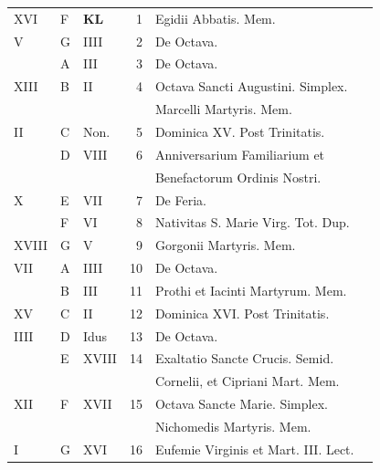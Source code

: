 \color{Red}\color{black}

\begin{center}
\begin{tabular}{l | l | l | r | l l}
\color{Red} XVI & F & \textbf{\color{Red} K\color{Blue}L} & 1 & Egidii Abbatis. Mem. & \color{Red} \\
\color{Red} V & G & \color{Red} IIII & 2 & De Octava. \\
\color{Red}  & \color{Red} A & \color{Red} III & 3 & De Octava. & \color{Red} \\
\color{Red} XIII & B & \color{Red} II & 4 & Octava Sancti Augustini. Simplex. & \color{Red} \\
& & & & \quad Marcelli Martyris. Mem. \\
\color{Red} II & C & \color{Red} Non. & 5 & Dominica XV. Post Trinitatis. \\
\color{Red}  & D & \color{Red} VIII & 6 & Anniversarium Familiarium et & \color{Red} \\
& & & & \quad Benefactorum Ordinis Nostri. \\
\color{Red} X & E & \color{Red} VII & 7 & De Feria. & \color{Red} \\
\color{Red}  & F & \color{Red} VI & 8 & \multicolumn{2}{l}{\color{Red} Nativitas S. Marie Virg. Tot. Dup.} \\
\color{Red} XVIII & G & \color{Red} V & 9 & Gorgonii Martyris. \color{Red} Mem. \\
\color{Red} VII & \color{Red} A & \color{Red} IIII & 10 & De Octava. & \color{Red} \\
\color{Red}  & B & \color{Red} III & 11 & \color{Red} Prothi et Iacinti Martyrum. Mem. \\
\color{Red} XV & C & \color{Red} II & 12 & Dominica XVI. Post Trinitatis. \\
\color{Red} IIII & D & \color{Red} Idus & 13 & De Octava. & \color{Red} \\
\color{Red}  & E & \color{Red} XVIII & 14 & Exaltatio Sancte Crucis. Semid. \\
& & & & \multicolumn{2}{l}{\quad Cornelii, et Cipriani Mart. Mem.} \\
\color{Red} XII & F & \color{Red} XVII & 15 & Octava Sancte Marie. Simplex. & \color{Red} \\
& & & & \quad Nichomedis Martyris. Mem. \\
\color{Red} I & G & \color{Red} XVI & 16 & Eufemie Virginis et Mart. III. Lect. & \color{Red} \\

\end{tabular}
\end{center}
